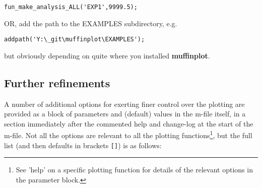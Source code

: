\documentclass[11pt,fleqn]{book} %
\begin{document}
\vspace{-2pt}\begin{verbatim}
fun_make_analysis_ALL('EXP1',9999.5);
\end{verbatim}\vspace{-2pt}

\noindent OR, add the path to the \footnotesize\textsf{EXAMPLES }\normalsize subdirectory, e.g.
\vspace{-2pt}\begin{verbatim}
addpath('Y:\_git\muffinplot\EXAMPLES');
\end{verbatim}\vspace{-2pt}
but obviously depending on quite where you installed \textbf{muffinplot}.


\subsection{Further refinements}

A number of additional options for exerting finer control over the plotting are provided as a block of parameters and (default) values in the m-file itself, in a section immediately after the commented help and change-log at the start of the m-file. Not all the options are relevant to all the plotting functions\footnote{See 'help' on a specific plotting function for details of the relevant options in the parameter block.}, but the full list (and then defaults in brackets \texttt{[]}) is as follows:
\end{document}
